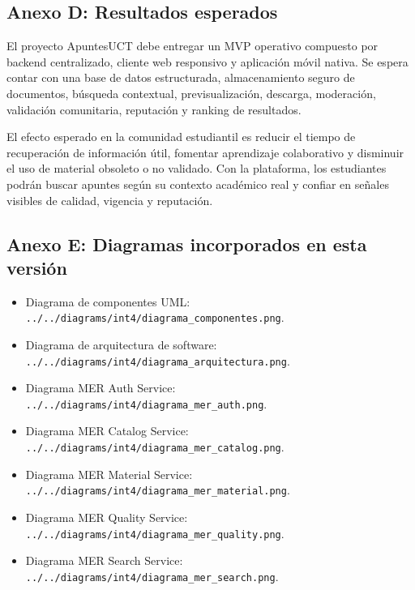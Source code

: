 \documentclass[12pt,a4paper]{article}
\begin{document}
\subsection*{Anexo D: Resultados esperados}

El proyecto ApuntesUCT debe entregar un MVP operativo compuesto por backend centralizado, cliente web responsivo y aplicación móvil nativa. Se espera contar con una base de datos estructurada, almacenamiento seguro de documentos, búsqueda contextual, previsualización, descarga, moderación, validación comunitaria, reputación y ranking de resultados.

El efecto esperado en la comunidad estudiantil es reducir el tiempo de recuperación de información útil, fomentar aprendizaje colaborativo y disminuir el uso de material obsoleto o no validado. Con la plataforma, los estudiantes podrán buscar apuntes según su contexto académico real y confiar en señales visibles de calidad, vigencia y reputación.

\subsection*{Anexo E: Diagramas incorporados en esta versión}

\begin{itemize}
    \item Diagrama de componentes UML: \texttt{../../diagrams/int4/diagrama\_componentes.png}.
    \item Diagrama de arquitectura de software: \texttt{../../diagrams/int4/diagrama\_arquitectura.png}.
    \item Diagrama MER Auth Service: \texttt{../../diagrams/int4/diagrama\_mer\_auth.png}.
    \item Diagrama MER Catalog Service: \texttt{../../diagrams/int4/diagrama\_mer\_catalog.png}.
    \item Diagrama MER Material Service: \texttt{../../diagrams/int4/diagrama\_mer\_material.png}.
    \item Diagrama MER Quality Service: \texttt{../../diagrams/int4/diagrama\_mer\_quality.png}.
    \item Diagrama MER Search Service: \texttt{../../diagrams/int4/diagrama\_mer\_search.png}.
\end{itemize}
\end{document}
